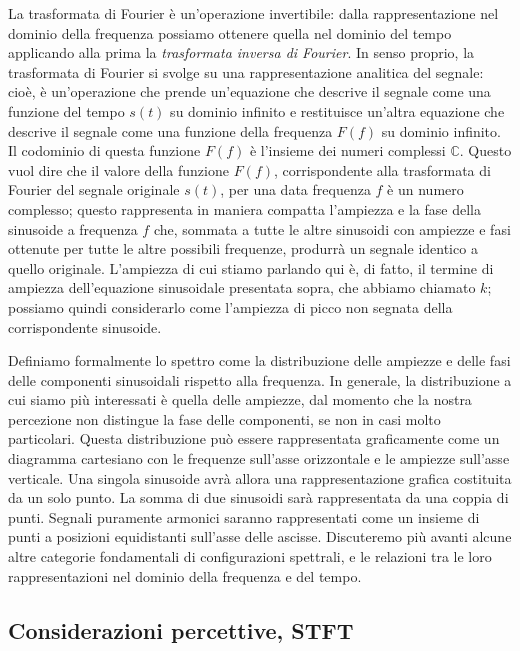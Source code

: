 La trasformata di Fourier è un'operazione invertibile: dalla rappresentazione nel dominio della frequenza possiamo ottenere quella nel dominio del tempo applicando alla prima la \emph{trasformata inversa di Fourier}. In senso proprio, la trasformata di Fourier si svolge su una rappresentazione analitica del segnale: cioè, è un'operazione che prende un'equazione che descrive il segnale come una funzione del tempo $s(t)$ su dominio infinito e restituisce un'altra equazione che descrive il segnale come una funzione della frequenza $F(f)$ su dominio infinito. Il codominio di questa funzione $F(f)$ è l'insieme dei numeri complessi $\mathbb{C}$. Questo vuol dire che il valore della funzione $F(f)$, corrispondente alla trasformata di Fourier del segnale originale $s(t)$, per una data frequenza $f$ è un numero complesso; questo rappresenta in maniera compatta l'ampiezza e la fase della sinusoide a frequenza $f$ che, sommata a tutte le altre sinusoidi con ampiezze e fasi ottenute per tutte le altre possibili frequenze, produrrà un segnale identico a quello originale. L'ampiezza di cui stiamo parlando qui è, di fatto, il termine di ampiezza dell'equazione sinusoidale presentata sopra, che abbiamo chiamato $k$; possiamo quindi considerarlo come l'ampiezza di picco non segnata della corrispondente sinusoide.

Definiamo formalmente lo spettro come la distribuzione delle ampiezze e delle fasi delle componenti sinusoidali rispetto alla frequenza. In generale, la distribuzione a cui siamo più interessati è quella delle ampiezze, dal momento che la nostra percezione non distingue la fase delle componenti, se non in casi molto particolari. Questa distribuzione può essere rappresentata graficamente come un diagramma cartesiano con le frequenze sull'asse orizzontale e le ampiezze sull'asse verticale. Una singola sinusoide avrà allora una rappresentazione grafica costituita da un solo punto. La somma di due sinusoidi sarà rappresentata da una coppia di punti. Segnali puramente armonici saranno rappresentati come un insieme di punti a posizioni equidistanti sull'asse delle ascisse. Discuteremo più avanti alcune altre categorie fondamentali di configurazioni spettrali, e le relazioni tra le loro rappresentazioni nel dominio della frequenza e del tempo.


 
\subsection{Considerazioni percettive, STFT}

